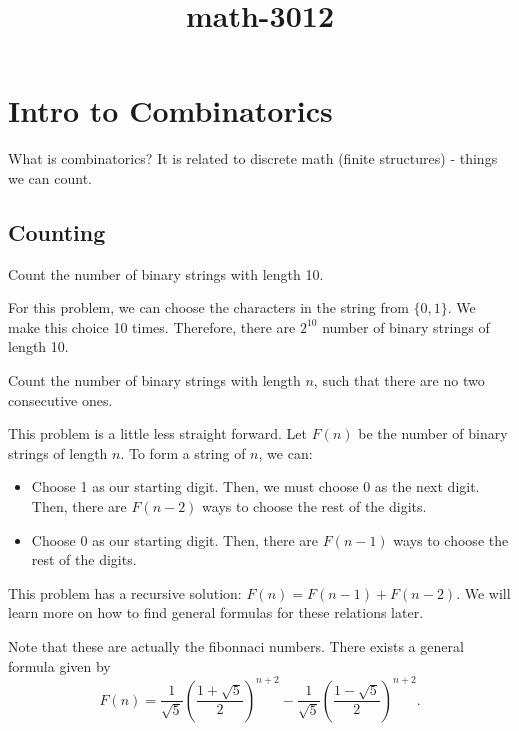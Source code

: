 \documentclass[a4paper]{article}
\title{math-3012}
\begin{document}
    \maketitle
    \tableofcontents{}

\section{Intro to Combinatorics}

What is combinatorics? It is related to discrete math (finite structures) - things we can count.

\subsection{Counting}
\begin{eg}
	Count the number of binary strings with length 10.
\end{eg}

For this problem, we can choose the characters in the string from \( \{0, 1\}   \). We make this choice 10 times. Therefore, there are \( 2^{10}  \) number of binary strings of length 10.

\begin{eg}
	Count the number of binary strings with length \( n \), such that there are no two consecutive ones. 
\end{eg}

This problem is a little less straight forward. Let \( F(n) \) be the number of binary strings of length \( n \). To form a string of \( n \), we can:
\begin{itemize}
	\item Choose 1 as our starting digit. Then, we must choose 0 as the next digit. Then, there are \( F(n-2) \) ways to choose the rest of the digits.
	\item Choose 0 as our starting digit. Then, there are \( F(n-1) \) ways to choose the rest of the digits.
\end{itemize}
This problem has a recursive solution: \( F(n) = F(n-1) + F(n-2) \). We will learn more on how to find general formulas for these relations later.

\begin{note}
	Note that these are actually the fibonnaci numbers. There exists a general formula given by \[
		F(n) = \frac{1}{\sqrt{5} }\left( \frac{1+\sqrt{5} }{2} \right)^{n+2} - \frac{1}{\sqrt{5} }\left( \frac{1-\sqrt{5} }{2} \right)^{n+2} 
	.\] 
\end{note}
\end{document}
